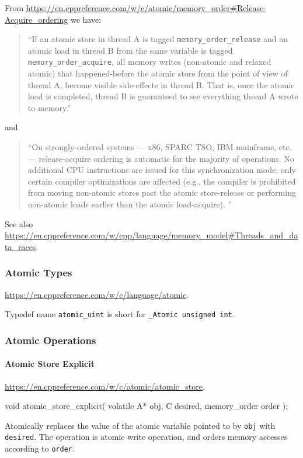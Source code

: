 From \url{https://en.cppreference.com/w/c/atomic/memory_order#Release-Acquire_ordering}
we have:
\begin{quote}
  ``If an atomic store in thread A is tagged \verb"memory_order_release"
  and an atomic load in thread B from the same variable
  is tagged \verb"memory_order_acquire",
  all memory writes (non-atomic and relaxed atomic) that happened-before
  the atomic store from the point of view of thread A,
  become visible side-effects in thread B.
  That is, once the atomic load is completed,
  thread B is guaranteed to see everything thread A wrote to memory.''
\end{quote}
and
\begin{quote}
  ``On strongly-ordered systems
  — x86, SPARC TSO, IBM mainframe, etc.
  — release-acquire ordering is automatic for the majority of operations.
  No additional CPU instructions are issued for this synchronization mode;
  only certain compiler optimizations are affected
  (e.g., the compiler is prohibited from moving non-atomic stores
  past the atomic store-release
  or performing non-atomic loads earlier than the atomic load-acquire). ''
\end{quote}

See also
\url{https://en.cppreference.com/w/cpp/language/memory_model#Threads_and_data_races}.


\subsubsection{Atomic Types}

\url{https://en.cppreference.com/w/c/language/atomic}.

Typedef name \verb"atomic_uint" is short for \verb"_Atomic unsigned int".

\subsubsection{Atomic Operations}


\paragraph{Atomic Store Explicit}

\url{https://en.cppreference.com/w/c/atomic/atomic_store}.

\begin{nicec}
void atomic_store_explicit( volatile A* obj, C desired, memory_order order );
\end{nicec}
Atomically replaces the value of the atomic variable pointed to by \texttt{obj}
with \texttt{desired}.
The operation is atomic write operation,
and orders memory accesses according to \texttt{order}.


